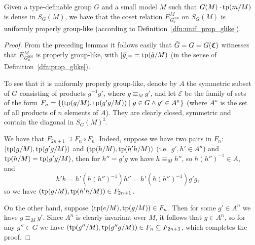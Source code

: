 	\begin{center}
	\end{center}
	\begin{lem}
		\label{lem:coset_rel_is_glike}
		Given a type-definable group $G$ and a small model $M$ such that $G(M)\cdot \operatorname{{tp}}(m/M)$ is dense in $S_G(M)$, we have that the coset relation $E_{G^{000}_{\emptyset}}^M$ on $S_G(M)$ is uniformly properly group-like (according to Definition~\ref{dfn:unif_prop_glike}).
	\end{lem}
	\begin{proof}
		From the preceding lemmas it follows easily that $\tilde G=G=G({\mathfrak C})$ witnesses that $E_{G^{000}_{\emptyset}}^M$ is properly group-like, with $[\tilde g]_{\equiv}=\operatorname{{tp}}(\tilde g/M)$ (in the sense of Definition~\ref{dfn:prop_glike}).
		
		To see that it is uniformly properly group-like, denote by $A$ the symmetric subset of $G$ consisting of products $g^{-1}g'$, where $g\equiv_M g'$, and let $\mathcal E$ be the family of sets of the form $F_n=\{
		(\operatorname{{tp}}(g/M),\operatorname{{tp}}(g'g/M))\mid g \in G\land g'\in A^n \}$ (where $A^n$ is the set of all products of $n$ elements of $A$). They are clearly closed, symmetric and contain the diagonal in $S_G(M)^2$.
		
		We have that $F_{2n+1}\supseteq F_{n}\circ F_n$. Indeed, suppose we have two pairs in $F_n$: $(\operatorname{{tp}}(g/M),\operatorname{{tp}}(g'g/M))$ and $(\operatorname{{tp}}(h/M), \operatorname{{tp}}(h'h/M))$ (i.e.\ $g',h'\in A^n$) and $\operatorname{{tp}}(h/M)=\operatorname{{tp}}(g'g/M)$, then for $h''=g'g$ we have $h\equiv_M h''$, so $h(h'')^{-1}\in A$, and
		\[
			h'h=h'(h(h'')^{-1})h''=h'(h(h'')^{-1})g'g,
		\]
		so we have $(\operatorname{{tp}}(g/M),\operatorname{{tp}}(h'h/M))\in F_{2n+1}$.
		
		On the other hand, suppose $(\operatorname{{tp}}(e/M),\operatorname{{tp}}(g/M))\in F_n$. Then for some $g'\in A^n$ we have $g\equiv_M g'$. Since $A^n$ is clearly invariant over $M$, it follows that $g\in A^n$, so for any $g''\in G$ we have $(\operatorname{{tp}}(g''/M),\operatorname{{tp}}(g''g/M))\in F_n\subseteq F_{2n+1}$, which completes the proof.
	\end{proof}
	
